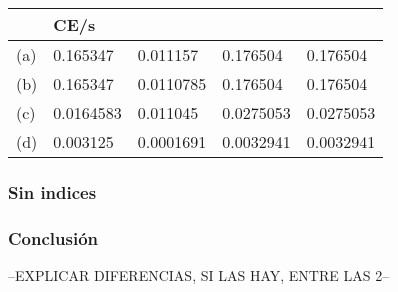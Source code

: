 
\begin{tabular}{| L | L | L | L | L |}
    \hline
     & CE/s &  &  &  \\ \hline
    (a) & 0.165347 & 0.011157 & 0.176504 & 0.176504 \\ \hline
    (b) & 0.165347 & 0.0110785 & 0.176504 & 0.176504 \\ \hline
    (c) & 0.0164583 & 0.011045 & 0.0275053 & 0.0275053 \\ \hline
    (d) & 0.003125 & 0.0001691 & 0.0032941 & 0.0032941 \\ \hline    
\end{tabular}
	
\subsubsection{Sin indices}
			
		
			
			


\subsubsection{Conclusión}

--EXPLICAR DIFERENCIAS, SI LAS HAY, ENTRE LAS 2--
